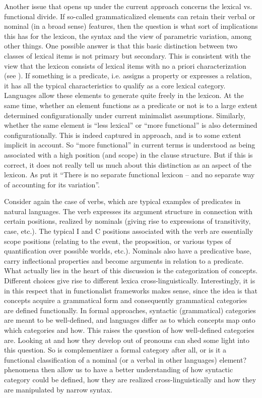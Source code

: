 \documentclass[output=paper]{langsci/langscibook}
\begin{document}
Another issue that opens up under the current approach concerns the lexical vs.
functional divide. If so-called grammaticalized elements can retain their
verbal or nominal (in a broad sense) features, then the question is what sort
of implications this has for the lexicon, the syntax and the view of parametric
variation, among other things. One possible answer is that this basic
distinction between two classes of lexical items is not primary but secondary.
This is consistent with the view that the lexicon consists of lexical items
with no a priori characterization (see \citealt{Marantz2001}). If something is
a predicate, i.e. assigns a property or expresses a relation, it has all the
typical characteristics to qualify as a core lexical category. Languages allow
these elements to generate quite freely in the lexicon. At the same time,
whether an element functions as a predicate or not is to a large extent
determined configurationally under current minimalist assumptions. Similarly,
whether the same element is \enquote{less lexical} or \enquote{more functional}
is also determined configurationally. This is indeed captured in
 approach, and is to some extent implicit in
 account. So \enquote{more functional} in current terms
is understood as being associated with a high position (and scope) in the
clause structure. But if this is correct, it does not really tell us much about
this distinction as an aspect of the lexicon. As \citet[5]{ManSav2011} put it
\enquote{There is no separate functional lexicon – and no separate way of
accounting for its variation}.

Consider again the case of verbs, which are typical examples of predicates in
natural languages. The verb expresses its argument structure in connection with
certain positions, realized by nominals (giving rise to expressions of
transitivity, case, etc.). The typical I and C positions associated with the
verb are essentially scope positions (relating to the event, the proposition,
or various types of quantification over possible worlds, etc.). Nominals also
have a predicative base, carry inflectional properties and become arguments in
relation to a predicate. What actually lies in the heart of this discussion is
the categorization of concepts. Different choices give rise to different lexica
cross-linguistically. Interestingly, it is in this respect that
 in functionalist frameworks makes sense, since the idea is
that concepts acquire a grammatical form and consequently grammatical
categories are defined functionally. In formal approaches, syntactic
(grammatical) categories are meant to be well-defined, and languages differ as
to which concepts map onto which categories and how. This raises the question
of how well-defined categories are. Looking at  and how they
develop out of pronouns can shed some light into this question. So is
complementizer a formal category after all, or is it a functional
classification of a nominal (or a verbal in other languages) element?
 phenomena then allow us to have a better understanding of
how syntactic category could be defined, how they are realized
cross-linguistically and how they are manipulated by narrow syntax.
\end{document}
